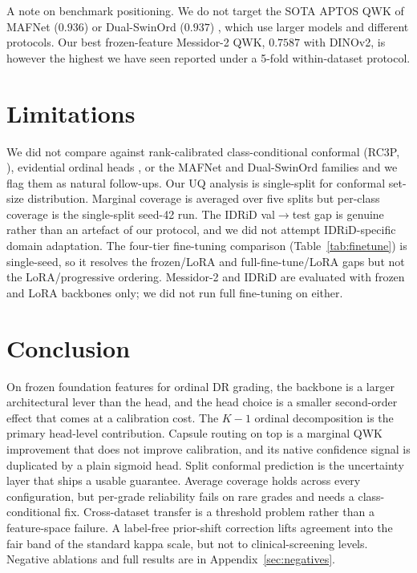 \documentclass[journal]{IEEEtran}
\begin{document}
A note on benchmark positioning. We do not target the SOTA APTOS QWK of MAFNet ($0.936$) \cite{ref:mafnet} or Dual-SwinOrd ($0.937$) \cite{ref:dualswinord}, which use larger models and different protocols. Our best frozen-feature Messidor-2 QWK, $0.7587$ with DINOv2, is however the highest we have seen reported under a 5-fold within-dataset protocol.

\section{Limitations}
\label{sec:limitations}

We did not compare against rank-calibrated class-conditional conformal (RC3P, \cite{ref:rank_conformal}), evidential ordinal heads \cite{ref:uaorlqap}, or the MAFNet and Dual-SwinOrd families \cite{ref:mafnet,ref:dualswinord} and we flag them as natural follow-ups. Our UQ analysis is single-split for conformal set-size distribution. Marginal coverage is averaged over five splits but per-class coverage is the single-split seed-42 run. The IDRiD val$\to$test gap is genuine rather than an artefact of our protocol, and we did not attempt IDRiD-specific domain adaptation. The four-tier fine-tuning comparison (Table~\ref{tab:finetune}) is single-seed, so it resolves the frozen/LoRA and full-fine-tune/LoRA gaps but not the LoRA/progressive ordering. Messidor-2 and IDRiD are evaluated with frozen and LoRA backbones only; we did not run full fine-tuning on either.

\section{Conclusion}
\label{sec:conclusion}
On frozen foundation features for ordinal DR grading, the backbone is a larger architectural lever than the head, and the head choice is a smaller second-order effect that comes at a calibration cost. The $K{-}1$ ordinal decomposition is the primary head-level contribution. Capsule routing on top is a marginal QWK improvement that does not improve calibration, and its native confidence signal is duplicated by a plain sigmoid head. Split conformal prediction is the uncertainty layer that ships a usable guarantee. Average coverage holds across every configuration, but per-grade reliability fails on rare grades and needs a class-conditional fix. Cross-dataset transfer is a threshold problem rather than a feature-space failure. A label-free prior-shift correction lifts agreement into the fair band of the standard kappa scale, but not to clinical-screening levels. Negative ablations and full results are in Appendix~\ref{sec:negatives}.
\end{document}

